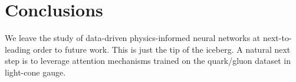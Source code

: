 \section{Conclusions}\label{sec:conclusions}

We leave the study of data-driven physics-informed neural networks at
next-to-leading order to future work. This is just the tip of the
iceberg. A natural next step is to leverage attention mechanisms trained
on the quark/gluon dataset in light-cone gauge.

